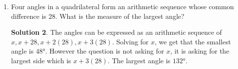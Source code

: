 \documentclass{article}
\theoremstyle{definition}
\newtheorem*{solution}{Solution}
\begin{document}
\begin{multicols}{2}
\begin{enumerate}
\begin{solution}
                The height of octagon ($AF$) is equal to $2 + 2\sqrt{2}$.
                Read the solution to problem 4 of 4.2 set B if you do not know how we derived this number.
                $FE = 2$.
                By the Pythagorean Theorem: $2^2 + (2 + 2\sqrt{2})^2 = (AE)^2$, so $8\sqrt{2} + 16 = (AE)^2$.
                $(AE)^2 = (AC)^2 + (CE)^2$, therefore $(AE)^2 = 2(AC)^2$.
                We are trying to find the area of the square $(AC)^2 = \frac{(AE)^2}{2} = \frac{8\sqrt{2} + 16}{2} = 4\sqrt2 + 8$ cm$^2$.
            \end{solution}
        \item Four angles in a quadrilateral form an arithmetic sequence whose common difference is $28$.
            What is the measure of the largest angle?
            \begin{solution}
                The angles can be expressed as an arithmetic sequence of $x, x + 28, x + 2(28), x + 3(28)$.
                Solving for $x$, we get that the smallest angle is $\ang{48}$.
                However the question is not asking for $x$, it is asking for the largest side which is $x + 3(28)$.
                The largest angle is $\ang{132}$.
            \end{solution}
    \end{enumerate}
\end{multicols}
\end{document}
